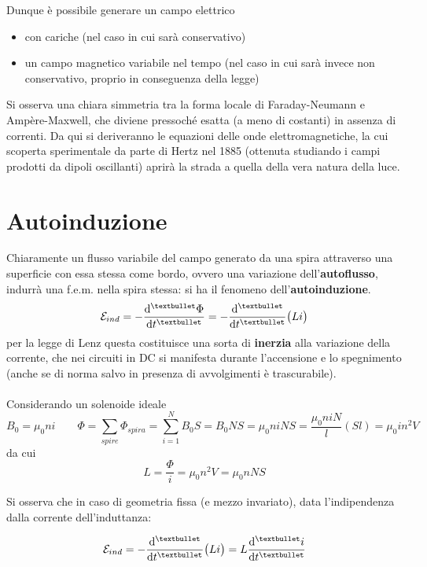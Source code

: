 
Dunque è possibile generare un campo elettrico
\begin{itemize}
\item con cariche (nel caso in cui sarà conservativo)
\item un campo magnetico variabile nel tempo (nel caso in cui sarà invece non conservativo, proprio in conseguenza della legge)
\end{itemize}
Si osserva una chiara simmetria tra la forma locale di Faraday-Neumann e Ampère-Maxwell, che diviene pressoché esatta (a meno di costanti) in assenza di correnti. Da qui si deriveranno le equazioni delle onde elettromagnetiche, la cui scoperta sperimentale da parte di Hertz nel 1885 (ottenuta studiando i campi prodotti da dipoli oscillanti) aprirà la strada a quella della vera natura della luce.

\section{Autoinduzione}

Chiaramente un flusso variabile del campo generato da una spira attraverso una superficie con essa stessa come bordo, ovvero una variazione dell'\textbf{autoflusso}, indurrà una f.e.m. nella spira stessa: si ha il fenomeno dell'\textbf{autoinduzione}.
\[\mathcal{E}_{ind} = - \dv[•]{\Phi}{t} = - \dv[•]{}{t} \big( L i \big)\]
per la legge di Lenz questa costituisce una sorta di \textbf{inerzia} alla variazione della corrente, che nei circuiti in DC si manifesta durante l'accensione e lo spegnimento (anche se di norma salvo in presenza di avvolgimenti è trascurabile).
\\~\\
Considerando un solenoide ideale 
\[B_0 = \mu_0 n i \qquad \Phi = \sum_{spire} \Phi_{spira} = \sum\limits_{i=1}^{N} B_0 S = B_0 N S = \mu_0 n i N S = \frac{\mu_0 n i N}{l} (S l) = \mu_0 i n^2 V\]
da cui
\[L = \frac{\Phi}{i} = \mu_0 n^2 V =  \mu_0 n N S\]

Si osserva che in caso di geometria fissa (e mezzo invariato), data l'indipendenza dalla corrente dell'induttanza:

\[\mathcal{E}_{ind} = - \dv[•]{}{t} \big( L i \big) = L \dv[•]{i}{t}\]

